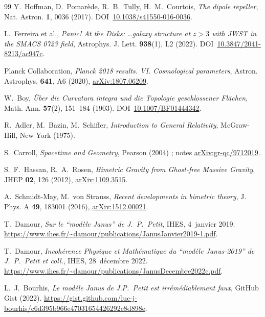\documentclass[11pt,a4paper]{article}
\theoremstyle{definition}
\theoremstyle{plain}
\begin{document}
\begin{thebibliography}{99}
 Y.~Hoffman, D.~Pomarède, R.~B.~Tully, H.~M.~Courtois,
\emph{The dipole repeller}, Nat. Astron. \textbf{1}, 0036 (2017).
DOI~\href{https://doi.org/10.1038/s41550-016-0036}{10.1038/s41550-016-0036}.

 L.~Ferreira et al.,
\emph{Panic! At the Disks: \dots galaxy structure at $z>3$ with JWST in the SMACS 0723 field},
Astrophys. J. Lett. \textbf{938}(1), L2 (2022).
DOI~\href{https://doi.org/10.3847/2041-8213/ac947c}{10.3847/2041-8213/ac947c}.

 Planck Collaboration,
\emph{Planck 2018 results. VI. Cosmological parameters}, Astron. Astrophys. \textbf{641}, A6 (2020),
\href{https://arxiv.org/abs/1807.06209}{arXiv:1807.06209}.

 W.~Boy,
\emph{Über die Curvatura integra und die Topologie geschlossener Flächen},
Math. Ann. \textbf{57}(2), 151--184 (1903).
DOI~\href{https://doi.org/10.1007/BF01444342}{10.1007/BF01444342}.

 R.~Adler, M.~Bazin, M.~Schiffer,
\emph{Introduction to General Relativity}, McGraw-Hill, New York (1975).

 S.~Carroll,
\emph{Spacetime and Geometry}, Pearson (2004) ;
notes \href{https://arxiv.org/abs/gr-qc/9712019}{arXiv:gr-qc/9712019}.

 S.~F.~Hassan, R.~A.~Rosen,
\emph{Bimetric Gravity from Ghost-free Massive Gravity}, JHEP \textbf{02}, 126 (2012),
\href{https://arxiv.org/abs/1109.3515}{arXiv:1109.3515}.

 A.~Schmidt-May, M.~von Strauss,
\emph{Recent developments in bimetric theory}, J. Phys. A \textbf{49}, 183001 (2016),
\href{https://arxiv.org/abs/1512.00021}{arXiv:1512.00021}.

 T.~Damour,
\emph{Sur le ``modèle Janus'' de J.~P.~Petit}, IHES, 4~janvier 2019.
\url{https://www.ihes.fr/~damour/publications/JanusJanvier2019-1.pdf}.

 T.~Damour,
\emph{Incohérence Physique et Mathématique du ``modèle Janus-2019'' de J.~P.~Petit et coll.},
IHES, 28~décembre 2022.
\url{https://www.ihes.fr/~damour/publications/JanusDecembre2022c.pdf}.

 L.~J.~Bourhis,
\emph{Le modèle Janus de J.P.~Petit est irrémédiablement faux}, GitHub Gist (2022).
\url{https://gist.github.com/luc-j-bourhis/c6d395b966e47031654426292e8d898e}.


\end{thebibliography}
\end{document}
